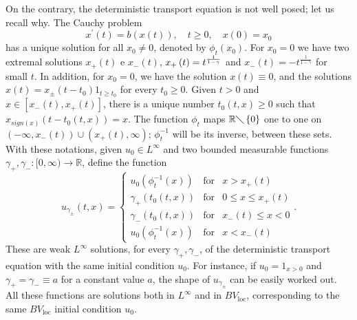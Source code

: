 \documentclass[a4paper,11pt]{article}
\begin{document}
On the contrary, the deterministic transport equation is not well posed; let
us recall why. The Cauchy problem
\begin{equation*}
x^{\prime }(t)=b\left( x\left( t\right) \right) ,\quad t\geq 0,\quad x\left(
0\right) =x_{0}
\end{equation*}
has a unique solution for all $x_{0}\neq 0$, denoted by $\phi _{t}\left(
x_{0}\right) $. For $x_{0}=0$ we have two extremal solutions $x_{+}\left(
t\right) $ e $x_{-}\left( t\right) $, $x_{+}\left( t\right) =t^{\frac{1}{%
1-\gamma }}$ and $x_{-}\left( t\right) =-t^{\frac{1}{1-\gamma }}$ for small $%
t$. In addition, for $x_{0}=0$, we have the solution $x\left( t\right)
\equiv 0$, and the solutions $x\left( t\right) =x_{\pm }\left(
t-t_{0}\right) 1_{t\geq t_{0}}$ for every $t_{0}\geq 0$. Given $t>0$ and $%
x\in \left[ x_{-}\left( t\right) ,x_{+}\left( t\right) \right] $, there is a
unique number $t_{0}\left( t,x\right) \geq 0$ such that $x_{sign(x)}\left(
t-t_{0}\left( t,x\right) \right) =x$. The function $\phi _{t}$ maps $\mathbb{%
R}\diagdown \left\{ 0\right\} $ one to one on $\left( -\infty ,x_{-}\left(
t\right) \right) \cup \left( x_{+}\left( t\right) ,\infty \right) $; $\phi
_{t}^{-1}$ will be its inverse, between these sets. With these notations,
given $u_{0}\in L^{\infty }$ and two bounded measurable functions $\gamma
_{+},\gamma _{-}:[0,\infty )\rightarrow \mathbb{R}$, define the function
\begin{equation}
u_{\gamma _{\pm }}\left( t,x\right) =\left\{
\begin{array}{ccc}
u_{0}\left( \phi _{t}^{-1}\left( x\right) \right) & \text{for} &
x>x_{+}\left( t\right) \\
\gamma _{+}\left( t_{0}\left( t,x\right) \right) & \text{for} & 0\leq x\leq
x_{+}\left( t\right) \\
\gamma _{-}\left( t_{0}\left( t,x\right) \right) & \text{for} & x_{-}\left(
t\right) \leq x<0 \\
u_{0}\left( \phi _{t}^{-1}\left( x\right) \right) & \text{for} &
x<x_{-}\left( t\right)
\end{array}
\right. .  \label{solutions}
\end{equation}
These are weak $L^{\infty }$ solutions, for every $\gamma _{+},\gamma _{-}$,
of the deterministic transport equation with the same initial condition $%
u_{0}$. For instance, if $u_{0}=1_{x>0}$ and $\gamma _{+}=\gamma _{-}\equiv
a $ for a constant value $a$, the shape of $u_{\gamma _{\pm }}$ can be
easily worked out. All these functions are solutions both in $L^{\infty }$ and
in $BV_{\text{loc}}$, corresponding to the same $BV_{\text{loc}}$ initial condition $u_{0}$.
\end{document}
